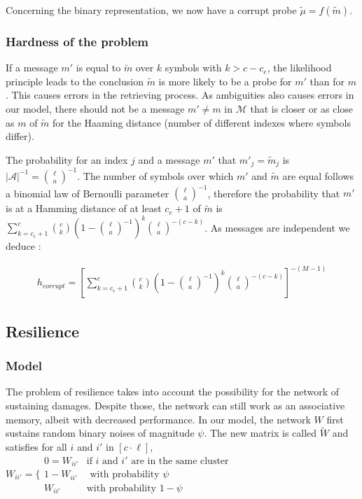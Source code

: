 \documentclass[english,10pt,twocolumn]{IEEEtran}
\theoremstyle{definition}
\begin{document}
	Concerning the binary representation, we now have a corrupt probe $\tilde{\mu} = f(\tilde{m})$.
	
	\subsubsection{Hardness of the problem}
		
	If a message $m'$ is equal to $\tilde{m}$ over $k$ symbols with $k > c - c_e$, the likelihood principle leads to the conclusion $\tilde{m}$ is more likely to be a probe for $m'$ than for $m$. This causes errors in the retrieving process. As ambiguities also causes errors in our model, there should not be a message $m' \neq m$ in $\mathcal{M}$ that is closer or as close as $m$ of $\tilde{m}$ for the Haaming distance (number of different indexes where symbols differ).
	
	The probability for an index $j$ and a message $m'$ that $m'_j = \tilde{m}_j$ is $|\mathcal{A}|^{-1} = \binom{\ell}{a}^{-1}$. The number of symbols over which $m'$ and $\tilde{m}$ are equal follows a binomial law of Bernoulli parameter $\binom{\ell}{a}^{-1}$, therefore the probability that $m'$ is at a Hamming distance of at least $c_e +1$ of $\tilde{m}$ is $ \sum_{k=c_e+1}^c \binom{c}{k} \left (1-{\ell \choose a}^{-1} \right )^k {\ell \choose a}^{-(c-k)}$. As messages are independent we deduce :
	
	\begin{align}
	h_{corrupt} = \left [\sum_{k=c_e+1}^c \binom{c}{k} \left (1-{\ell \choose a}^{-1} \right )^k {\ell \choose a}^{-(c-k)} \right ] ^{-(M-1)}
	\end{align}	
	
		
	\subsection{Resilience}
	
	\subsubsection{Model}
	
	The problem of resilience takes into account the possibility for the network of sustaining damages. Despite those, the network can still work as an associative memory, albeit with decreased performance. In our model, the network $W$ first sustains random binary noises of magnitude $\psi$. The new matrix is called $\tilde{W}$ and satisfies for all $i$ and $i'$ in $[c \cdot \ell ]$, $W_{ii'} = \Bigg \{ \begin{array}{ll}
	0 = W_{ii'} & \mbox{if $i$ and $i'$ are in the same cluster}\\
	1-W_{ii'} & \mbox{ with probability }  \psi\\
	W_{ii'} & \mbox{with probability } 1 - \psi\end{array}$
	
\end{document}
